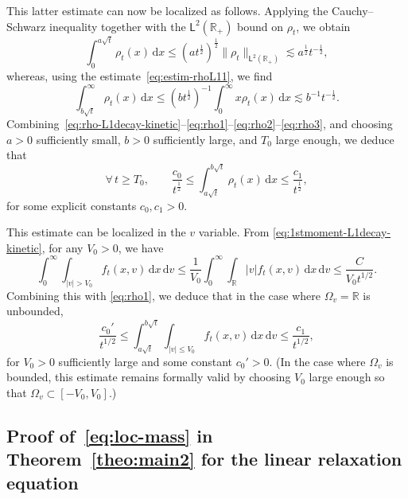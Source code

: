 \documentclass[11pt]{amsart}
\theoremstyle{definition}
\theoremstyle{remark}
\numberwithin{equation}{section}
\newcommand\R{{\mathbb R}}
\newcommand{\sfL}{\mathsf{L}}
\begin{document}
This latter estimate can now be localized as follows. Applying the Cauchy–Schwarz inequality together with the $\sfL^2(\R_+)$ bound on $\rho_t$, we obtain
\begin{equation}
  \label{eq:rho2}
  \int_0^{a \sqrt{t}} \rho_t(x)\, \mathrm{d}x \leq \left( at^{\frac{1}{2}} \right)^{\frac{1}{2}} \| \rho_t \|_{\sfL^2(\mathbb{R}_+)} \lesssim a^{\frac{1}{2}} t^{-\frac{1}{2}},
\end{equation}
whereas, using the estimate~\eqref{eq:estim-rhoL11}, we find
\begin{equation}
  \label{eq:rho3}
  \int_{b \sqrt{t}}^\infty \rho_t(x)\, \mathrm{d}x \leq \left(bt^{\frac{1}{2}}\right)^{-1} \int_0^\infty x \rho_t(x)\, \mathrm{d}x \lesssim b^{-1} t^{-\frac{1}{2}}.
\end{equation}
Combining~\eqref{eq:rho-L1decay-kinetic}–\eqref{eq:rho1}–\eqref{eq:rho2}–\eqref{eq:rho3}, and choosing $a > 0$ sufficiently small, $b > 0$ sufficiently large, and $T_0$ large enough, we deduce that
\begin{equation}
  \label{eq:kinetic-rho-estimate-localization}
  \forall\, t \geq T_0, \qquad \frac{c_0}{t^{\frac{1}{2}}} \leq \int_{a \sqrt{t}}^{b \sqrt{t}} \rho_t(x)\, \mathrm{d}x \leq \frac{c_1}{t^{\frac{1}{2}}},
\end{equation}
for some explicit constants $c_0, c_1 > 0$.

This estimate can be localized in the $v$ variable. From \eqref{eq:1stmoment-L1decay-kinetic}, for any $V_0 > 0$, we have
\begin{equation*}
  \int_0^\infty \int_{|v| > V_0} f_t(x,v) \, \mathrm{d}x \, \mathrm{d}v \leq \frac{1}{V_0} \int_0^\infty \int_{\mathbb{R}} |v| f_t(x,v) \, \mathrm{d}x \, \mathrm{d}v \leq \frac{C}{V_0 t^{1/2}}.
\end{equation*}
Combining this with \eqref{eq:rho1}, we deduce that in the case where $\Omega_v = \mathbb{R}$ is unbounded,
\begin{equation}
  \label{eq:loc-loc}
  \frac{c_0'}{t^{1/2}} \leq \int_{a \sqrt{t}}^{b \sqrt{t}} \int_{|v| \leq V_0} f_t(x,v) \, \mathrm{d}x \, \mathrm{d}v \leq \frac{c_1}{t^{1/2}},
\end{equation}
for $V_0 > 0$ sufficiently large and some constant $c_0' > 0$. (In the case where $\Omega_v$ is bounded, this estimate remains formally valid by choosing $V_0$ large enough so that $\Omega_v \subset [-V_0, V_0]$.)

\subsection{Proof of~\eqref{eq:loc-mass} in Theorem~\ref{theo:main2} for the linear relaxation equation}
\end{document}
